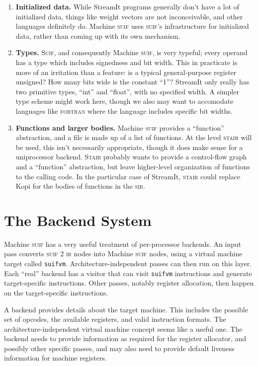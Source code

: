 \documentclass[11pt]{article}
\def\fortran{\textsc{fortran}}
\def\ir{\textsc{ir}}
\def\sir{\textsc{sir}}
\def\stair{\textsc{stair}}
\def\Stair{\textsc{Stair}}
\def\suif{\textsc{suif}}
\def\Suif{\textsc{Suif}}
\def\suifvm{\texttt{suifvm}}
\def\machsuif{Machine \suif}
\begin{document}
\begin{enumerate}
\item \textbf{Initialized data.}  While StreamIt programs generally
  don't have a lot of initialized data, things like weight vectors are
  not inconceivable, and other languages definitely do.  \machsuif{}
  uses \suif's infrastructure for initialized data, rather than coming
  up with its own mechanism.
\item \textbf{Types.}  \Suif, and consequently \machsuif, is very
  typeful; every operand has a type which includes signedness and bit
  width.  This in practicate is more of an irritation than a feature:
  is a typical general-purpose register unsigned?  How many bits wide
  is the constant ``1''?  StreamIt only really has two primitive
  types, ``int'' and ``float'', with no specified width.  A simpler
  type scheme might work here, though we also may want to accomodate
  languages like \fortran{} where the language includes specific bit
  widths.
\item \textbf{Functions and larger bodies.}  \machsuif{} provides a
  ``function'' abstraction, and a file is made up of a list of
  functions.  At the level \stair{} will be used, this isn't
  necessarily appropriate, though it does make sense for a
  uniprocessor backend.  \Stair{} probably wants to provide a
  control-flow graph and a ``function'' abstraction, but leave
  higher-level organization of functions to the calling code.  In the
  particular case of StreamIt, \stair{} could replace Kopi for the
  bodies of functions in the \sir{}.
\end{enumerate}

\section{The Backend System}

\machsuif{} has a very useful treatment of per-processor backends.  An
input pass converts \suif{} 2 \ir{} nodes into \machsuif{} nodes,
using a virtual machine target called \suifvm.
Architecture-independent passes can then run on this layer.  Each
``real'' backend has a visitor that can visit \suifvm{} instructions
and generate target-specific instructions.  Other passes, notably
register allocation, then happen on the target-specific instructions.

A backend provides details about the target machine.  This includes
the possible set of opcodes, the available registers, and valid
instruction formats.  The architecture-independent virtual machine
concept seems like a useful one.  The backend needs to provide
information as required for the register allocator, and possibly other
specific passes, and may also need to provide default liveness
information for machine registers.
\end{document}
